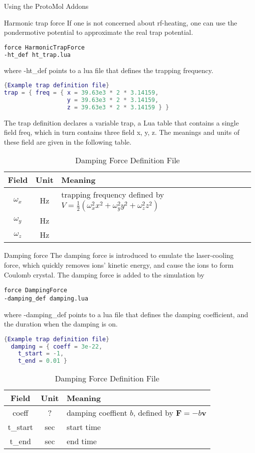 \documentclass{article}
\begin{document}
\begin{section} {Using the ProtoMol Addons}
\begin{subsection} {Harmonic trap force}
If one is not concerned about rf-heating, one can use the pondermotive potential to approximate the real trap potential. 
\begin{lstlisting}[language=bash]
force HarmonicTrapForce
-ht_def ht_trap.lua
\end{lstlisting}
where -ht\_def points to a lua file that defines the trapping frequency.
\begin{lstlisting}[language=LUA]{Example trap definition file}
trap = { freq = { x = 39.63e3 * 2 * 3.14159,
                  y = 39.63e3 * 2 * 3.14159,
                  z = 39.63e3 * 2 * 3.14159 } }
\end{lstlisting}
The trap definition declares a variable trap, a Lua table that contains a single field freq, which in turn contains three field x, y, z. The meanings and units of these field are given in the following table.
\begin{table}[h!]
  \centering
  \begin{tabular}{ c  c  l } \toprule
    Field & Unit & Meaning\\ \midrule
    $\omega_x$ & Hz & trapping frequency defined by $V=\frac{1}{2}(\omega_x^2x^2+\omega_y^2y^2+\omega_z^2z^2)$\\
    $\omega_y$ & Hz &   \\
    $\omega_z$ & Hz &   \\ \bottomrule
  \end{tabular}
  \caption{Damping Force Definition File}
  \label{tab:harmonic_trap_def}
\end{table}


\end{subsection}
\begin{subsection} {Damping force}
The damping force is introduced to emulate the laser-cooling force, which quickly removes ions' kinetic energy, and cause the ions to form Coulomb crystal. The damping force is added to the simulation by
\begin{lstlisting}
force DampingForce
-damping_def damping.lua
\end{lstlisting}
where -damping\_def points to a lua file that defines the damping coefficient, and the duration when the damping is on.
\begin{lstlisting}[language=LUA]{Example trap definition file}
  damping = { coeff = 3e-22,
    t_start = -1,
    t_end = 0.01 }
\end{lstlisting}


\begin{table}[h!]
  \centering
  \begin{tabular}{ c  c  l } \toprule
    Field & Unit & Meaning\\ \midrule
    coeff & ? & damping coeffient $b$, defined by $\mathbf{F}=-b\mathbf{v}$\\
    t\_start & sec & start time  \\
    t\_end & sec & end time  \\ \bottomrule
  \end{tabular}
  \caption{Damping Force Definition File}
  \label{tab:damping_def}
\end{table}


\end{subsection}
\end{section}
\end{document}
